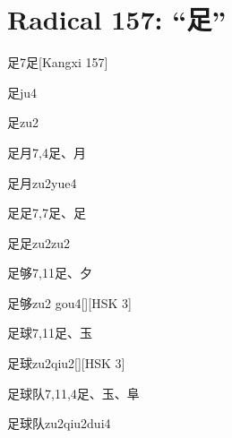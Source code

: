 
\section*{Radical 157: ``⾜''}

\begin{entry}{足}{7}{⾜}[Kangxi 157]
  \begin{phonetics}{足}{ju4}
  \end{phonetics}
  \begin{phonetics}{足}{zu2}
  \end{phonetics}
\end{entry}

\begin{entry}{足月}{7,4}{⾜、⽉}
  \begin{phonetics}{足月}{zu2yue4}
  \end{phonetics}
\end{entry}

\begin{entry}{足足}{7,7}{⾜、⾜}
  \begin{phonetics}{足足}{zu2zu2}
  \end{phonetics}
\end{entry}

\begin{entry}{足够}{7,11}{⾜、⼣}
  \begin{phonetics}{足够}{zu2 gou4}[][HSK 3]
  \end{phonetics}
\end{entry}

\begin{entry}{足球}{7,11}{⾜、⽟}
  \begin{phonetics}{足球}{zu2qiu2}[][HSK 3]
  \end{phonetics}
\end{entry}

\begin{entry}{足球队}{7,11,4}{⾜、⽟、⾩}
  \begin{phonetics}{足球队}{zu2qiu2dui4}
  \end{phonetics}
\end{entry}

